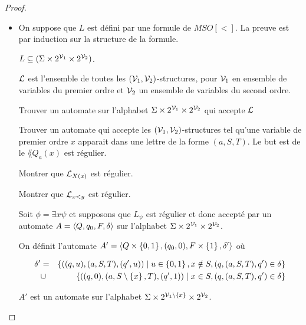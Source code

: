 \begin{proof}
\begin{itemize}
\begin{itemize}
		      \end{itemize}

		\item \fbox{$\Rightarrow$}

		      On suppose que $L$ est défini par une formule de $MSO[<]$.
		      La preuve est par induction sur la structure de la formule.

		      $L \subseteq (\Sigma \times 2^{\mathcal{V}_1} \times 2 ^ {\mathcal{V}_2})$.

		      $\mathcal{L}$ est l'ensemble de toutes les $(\mathcal{V}_1, \mathcal{V}_2)$-structures, pour $\mathcal{V}_1$ en ensemble de variables du premier
		      ordre et $\mathcal{V}_2$ un ensemble de variables du second ordre.

		      \begin{exercice}
			      Trouver un automate sur l'alphabet $\Sigma \times 2^{\mathcal{V}_1} \times 2 ^ {\mathcal{V}_2}$ qui accepte $\mathcal{L}$
		      \end{exercice}

		      \begin{exercice}
			      Trouver un automate qui accepte les $(\mathcal{V}_1, \mathcal{V}_2)$-structures tel qu'une variable de premier ordre $x$ apparait
			      dans une lettre de la forme $(a,S,T)$. Le but est de \mq le $\lang {Q_a(x)}$ est régulier.
		      \end{exercice}

		      \begin{exercice}
			      Montrer que $\mathcal{L}_{X(x)}$ est régulier.
		      \end{exercice}

		      \begin{exercice}
			      Montrer que $\mathcal{L}_{x< y}$ est régulier.
		      \end{exercice}


		      Soit $\phi = \exists x \psi$ et supposons que $L_{\psi}$ est régulier et donc accepté par un automate $A = \langle Q, q_0, F, \delta \rangle$ sur l'alphabet
		      $\Sigma \times 2^{\mathcal{V}_1} \times 2 ^ {\mathcal{V}_2}$.

		      On définit l'automate $A' = \langle Q\times \left\{0,1\right\}, (q_0,0), F \times \left\{1\right\} , \delta' \rangle$ où

		      \begin{eqnarray*}
			      \delta' &=& \left\{((q,u),(a,S,T),(q',u)) \mid u \in \left\{0,1\right\}, x \notin S, (q,(a,S,T),q')\in \delta\right\} \\
			      &\cup& \left\{((q,0),(a,S\setminus \left\{x\right\},T),(q',1)) \mid  x \in S, (q,(a,S,T),q')\in \delta\right\}
		      \end{eqnarray*}


		      $A'$ est un automate sur l'alphabet $\Sigma \times 2^{\mathcal{V}_1\setminus \left\{x\right\}} \times 2 ^ {\mathcal{V}_2}$.

	\end{itemize}
\end{proof}



